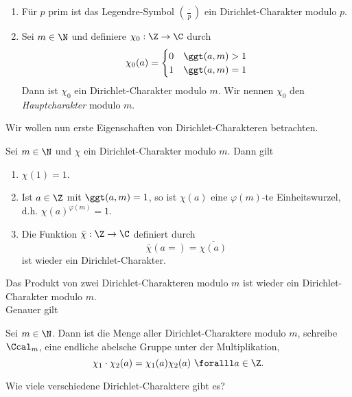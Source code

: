 \begin{exmp*}
	\begin{enumerate}[label={\roman*})]
		\item Für $p$ prim ist das Legendre-Symbol $\left(\frac{\cdot}{p}\right)$ ein Dirichlet-Charakter modulo $p$.
		\item Sei $m \in \N$ und definiere $\chi_0: \Z \to \C$ durch
			\[ \chi_0(a) = \begin{cases}
				0 &\ggt(a,m)>1\\
				1 &\ggt(a,m)=1
			\end{cases} \]
			Dann ist $\chi_0$ ein Dirichlet-Charakter modulo $m$. Wir nennen $\chi_0$ den \emph{Hauptcharakter} modulo $m$.
	\end{enumerate}
\end{exmp*}

Wir wollen nun erste Eigenschaften von Dirichlet-Charakteren betrachten.

\begin{lem}\autolabel
	Sei $m \in \N$ und $\chi$ ein Dirichlet-Charakter modulo $m$. Dann gilt
	\begin{enumerate}[label={\roman*})]
		\item $\chi(1)=1$.
		\item Ist $a \in \Z$ mit $\ggt(a,m)=1$, so ist $\chi(a)$ eine $\varphi(m)$-te Einheitswurzel, d.h. $\chi(a)^{\varphi(m)}=1$.
		\item Die Funktion $\bar{\chi}: \Z \to \C$ definiert durch
			\[ \bar{\chi}(a=) = \overbar{\chi(a)} \]
			ist wieder ein Dirichlet-Charakter.
	\end{enumerate}
\end{lem}

\begin{rem*}
	Das Produkt von zwei Dirichlet-Charakteren modulo $m$ ist wieder ein Dirichlet-Charakter modulo $m$.\\
	Genauer gilt
\end{rem*}

\begin{lem}\autolabel
	Sei $m \in \N$. Dann ist die Menge aller Dirichlet-Charaktere modulo $m$, schreibe $\Ccal_m$, eine endliche abelsche Gruppe unter der Multiplikation,
	\[ \chi_1 \cdot \chi_2(a) = \chi_1(a) \chi_2(a) \ \foralll a \in \Z. \]
\end{lem}

\begin{frage*}
	Wie viele verschiedene Dirichlet-Charaktere gibt es?
\end{frage*}

